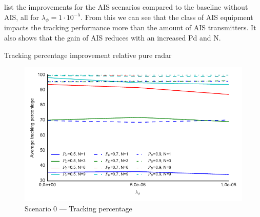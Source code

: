  list the improvements for the AIS scenarios compared to the baseline without AIS, all for \(\lambda_\phi = 1\cdot 10^{-5}\). From this we can see that the class of AIS equipment impacts the tracking performance more than the amount of AIS transmitters. It also shows that the gain of AIS reduces with an increased \gls{Pd} and N.

\begin{table}[H]
\centering
{}
\caption{Tracking percentage improvement relative pure radar}\label{tab:tracking_percentage_improvement}
\end{table}

\begin{figure}[H]
\centering
\includegraphics{Figures/plots/Scenario0_Tracking-TrackingPercentage.pdf}
\caption{Scenario 0 --- Tracking percentage}\label{fig:scenario0_tracking_percentage}
\end{figure}

